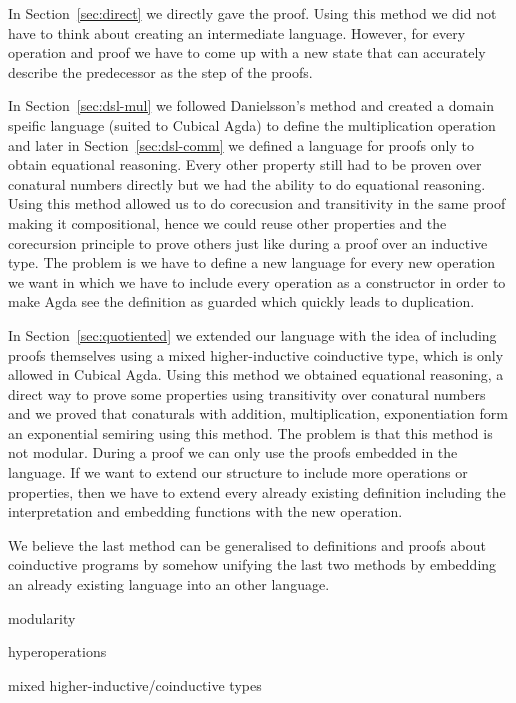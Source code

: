 \documentclass[sigplan, screen, natbib=false, review]{acmart}
\begin{document}
In Section~\ref{sec:direct} we directly gave the proof. Using this method we did not have to think
about creating an intermediate language. However, for every operation and proof we have to
come up with a new state that can accurately describe the predecessor as the step of the proofs.

In Section~\ref{sec:dsl-mul} we followed Danielsson's \cite{danielsson-beating} method and created a domain
speific language (suited to Cubical Agda) to define the multiplication operation and later in Section~\ref{sec:dsl-comm} we
defined a language for proofs only to obtain equational reasoning. Every other property still had to be
proven over conatural numbers directly but we had the ability to do equational reasoning.
Using this method allowed us to do corecusion and transitivity in the same proof making it compositional,
hence we could reuse other properties and the corecursion principle to prove others
just like during a proof over an inductive type. The problem is we have to define a new language for
every new operation we want in which we have to include every operation as a constructor
in order to make Agda see the definition as guarded which quickly leads to duplication.

In Section~\ref{sec:quotiented} we extended our language with the idea of including proofs themselves using
a mixed higher-inductive coinductive type, which is only allowed in Cubical Agda.
Using this method we obtained equational reasoning, a direct way
to prove some properties using transitivity over conatural numbers and we proved that conaturals with addition, multiplication,
exponentiation form an exponential semiring using this method. The problem is that this method is not modular.
During a proof we can only use the proofs embedded in the language. If we want to extend our structure
to include more operations or properties, then we have to extend every already
existing definition including the interpretation and embedding functions with the new operation.

We believe the last method can be generalised to definitions and proofs about coinductive
programs by somehow unifying the last two methods by embedding an already existing
language into an other language.

modularity

hyperoperations

mixed higher-inductive/coinductive types

\printbibliography
\end{document}
